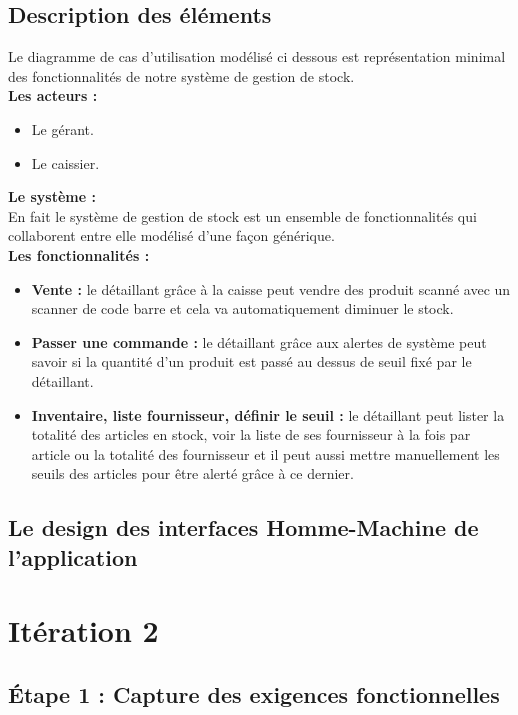 \documentclass[french,10pt,a4paper]{report}
\begin{document}
\subsection{\textcolor{bb}{Description des éléments}}
Le diagramme de cas d’utilisation modélisé ci dessous est représentation minimal des fonctionnalités de notre système de gestion de stock.\\
\textbf{Les acteurs :} 
\begin{itemize}
\item Le gérant.
\item Le caissier.
\end{itemize}
\textbf{Le système :}\\
En fait le système de gestion de stock est un ensemble de fonctionnalités qui collaborent entre elle modélisé d’une façon générique.\\
\textbf{Les fonctionnalités :}
\begin{itemize}
\item \textbf{Vente :} le détaillant grâce à la caisse peut vendre des produit scanné avec un scanner de code barre et cela va automatiquement diminuer le stock.
\item \textbf{ Passer une commande :} le détaillant grâce aux alertes de système peut savoir si la quantité d’un produit est passé au dessus de seuil fixé par le détaillant.
\item \textbf{Inventaire, liste fournisseur, définir le seuil :} le détaillant peut lister la totalité des articles en stock, voir la liste de ses fournisseur à la fois par article ou la totalité des fournisseur et il peut aussi mettre manuellement les seuils des articles pour être alerté grâce à ce dernier.
\end{itemize}

\subsection{\textcolor{bb}{ Le design des interfaces Homme-Machine de l’application}}


\section{\textcolor{rr}{Itération 2}}
\subsection{\textcolor{bb}{Étape 1 : Capture des exigences fonctionnelles}}
\end{document}
